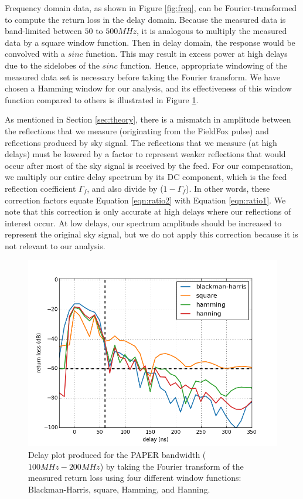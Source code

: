 \documentclass[12pt,preprint]{aastex}
\begin{document}
Frequency domain data, as shown in Figure \ref{fig:freq}, can be Fourier-transformed to compute the return loss in the delay domain. Because the measured data is band-limited between $50$ to $500MHz$, it is analogous to multiply the measured data by a square window function. Then in delay domain, the response would be convolved with a $sinc$ function. This may result in excess power at high
delays due to the sidelobes of the $sinc$ function. Hence, appropriate windowing of the measured data set is necessary before taking the Fourier transform.
We have chosen a Hamming window for our analysis, and its effectiveness of this
window function compared to others is illustrated in Figure
\ref{fig:window}. 

As mentioned in Section \ref{sec:theory}, there is a mismatch in amplitude
between the reflections that we measure (originating from the FieldFox pulse)
and reflections produced by sky signal. The reflections that we measure (at high
delays) must be lowered by a factor to represent weaker reflections that would
occur after most of the sky signal is received by the feed. For our
compensation, we multiply our entire delay spectrum by its DC component, which is the feed reflection coefficient $\Gamma_{f}$, and also divide by ($1-\Gamma_{f}$). In other words, these correction factors equate Equation \ref{eqn:ratio2} with Equation \ref{eqn:ratio1}. 
We note that this correction is only accurate at high delays where our
reflections of interest occur. At low delays, our spectrum amplitude should be
increased to represent the original sky signal, but we do not apply this
correction because it is not relevant to our analysis.

\begin{figure}[H]
\centering
\includegraphics[totalheight=0.41\textheight]{plots/bh_vs_sq.png}
\caption{Delay plot produced for the PAPER bandwidth ($100MHz-200MHz$) by taking the Fourier transform of the measured return loss using four different window functions: Blackman-Harris, square, Hamming, and Hanning.}
\label{fig:window}
\end{figure}
\end{document}

